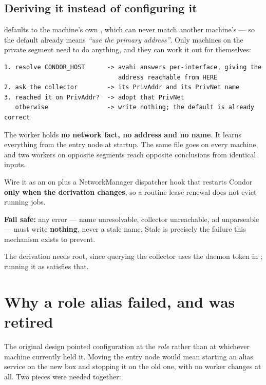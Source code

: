 \subsection{Deriving it instead of configuring it}

 defaults to the machine's own ,
which can never match another machine's --- so the default already means
\emph{``use the primary address''}. Only machines on the private segment need to
do anything, and they can work it out for themselves:

\begin{lstlisting}[style=term]
1. resolve CONDOR_HOST      -> avahi answers per-interface, giving the
                               address reachable from HERE
2. ask the collector        -> its PrivAddr and its PrivNet name
3. reached it on PrivAddr?  -> adopt that PrivNet
   otherwise                -> write nothing; the default is already correct
\end{lstlisting}

\begin{keypoint}
The worker holds \textbf{no network fact, no address and no name}. It learns
everything from the entry node at startup. The same file goes on every machine,
and two workers on opposite segments reach opposite conclusions from identical
inputs.
\end{keypoint}

Wire it as an  on  plus a NetworkManager
dispatcher hook that restarts Condor \textbf{only when the derivation changes},
so a routine lease renewal does not evict running jobs.

\textbf{Fail safe:} any error --- name unresolvable, collector unreachable, ad
unparseable --- must write \textbf{nothing}, never a stale name. Stale is
precisely the failure this mechanism exists to prevent.

The derivation needs root, since querying the collector uses the daemon token in
; running it as  satisfies that.

\section{Why a role alias failed, and was retired}

The original design pointed configuration at the \emph{role} rather than at
whichever machine currently held it. Moving the entry node would mean starting an
alias service on the new box and stopping it on the old one, with no worker
changes at all. Two pieces were needed together:

